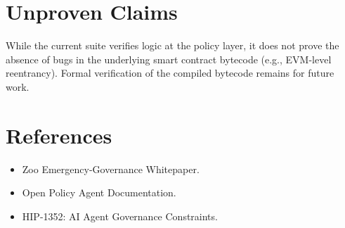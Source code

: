 \documentclass[11pt,a4paper]{article}
\begin{document}
\section{Unproven Claims}
While the current suite verifies logic at the policy layer, it does not prove the absence of bugs in the underlying smart contract bytecode (e.g., EVM-level reentrancy). Formal verification of the compiled bytecode remains for future work.


\section*{References}
\begin{itemize}
    \item Zoo Emergency-Governance Whitepaper.
    \item Open Policy Agent Documentation.
    \item HIP-1352: AI Agent Governance Constraints.
\end{itemize}
\end{document}
